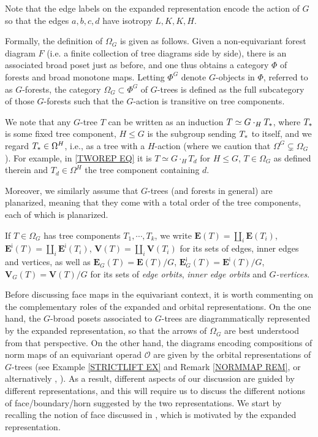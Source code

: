 \documentclass[a4paper,10pt
,draft
]{article}%
\begin{document}
Note that the edge labels on the expanded representation encode the action of $G$ so that the edges 
$a,b,c,d$ have isotropy $L,K,K,H$.

Formally, the definition of $\Omega_G$ \cite[Def. 5.44]{Per17} is given as follows.
Given a non-equivariant forest diagram $F$ 
(i.e. a finite collection of tree diagrams side by side),
there is
an associated broad poset just as before, and one thus obtains a category $\Phi$ of forests and broad monotone maps.
Letting $\Phi^G$ denote $G$-objects in $\Phi$, referred to as $G$-forests,
the category $\Omega_G \subset \Phi^G$ of $G$-trees
is defined as the full subcategory of those $G$-forests such that the $G$-action is transitive on tree components.

We note that any $G$-tree $T$ can be written as
an induction $T \simeq G \cdot_H T_{\**}$, where $T_{\**}$ is some fixed tree component, $H\leq G$ is the subgroup sending $T_{\**}$ to itself,
and we regard $T_{\**} \in \Omega^H$, i.e., as a tree with a $H$-action (where we caution that $\Omega^G \subsetneq \Omega_G$).
For example, in \eqref{TWOREP EQ} it is 
$T \simeq G \cdot_H T_d$ for $H\leq G$, $T \in \Omega_G$ as defined therein and
$T_d \in \Omega^H$ the tree component containing $d$. 

Moreover, we similarly assume that $G$-trees (and forests in general) are planarized, meaning that they come with a total order of the tree components, each of which is  planarized.

If $T\in \Omega_G$ has tree components $T_1,\cdots, T_k$, we write
$\boldsymbol{E}(T) = \amalg_i \boldsymbol{E}(T_i)$, 
$\boldsymbol{E}^{\mathsf{i}}(T) = 
\amalg_i \boldsymbol{E}^{\mathsf{i}}(T_i)$,
$\boldsymbol{V}(T) = \amalg_i \boldsymbol{V}(T_i)$
for its sets of edges, inner edges and vertices, as well as
$\boldsymbol{E}_G(T) = \boldsymbol{E}(T)/G$,
$\boldsymbol{E}^{\mathsf{i}}_G(T) = \boldsymbol{E}^{\mathsf{i}}(T)/G$,
$\boldsymbol{V}_G(T) = \boldsymbol{V}(T)/G$ for its sets of 
\textit{edge orbits},
\textit{inner edge orbits} and
\textit{$G$-vertices}.

Before discussing face maps in the equivariant context, it is worth commenting on the complementary roles of the expanded and orbital representations.
On the one hand, the $G$-broad posets associated to $G$-trees are diagrammatically represented by the expanded representation,
so that the arrows of $\Omega_{G}$ are best understood from that perspective.
On the other hand, the diagrams encoding compositions of norm maps of an equivariant operad $\mathcal{O}$
are given by the orbital representations of  
$G$-trees (see Example \ref{STRICTLIFT EX} and Remark \ref{NORMMAP REM}, or alternatively 
\cite[Ex. 4.9]{Per17}, \cite[(1.10)]{BP17}).
As a result, different aspects of our discussion are guided by different representations, and this will require us to discuss the different notions of face/boundary/horn suggested by the two representations.
We start by recalling the notion of face discussed in \cite{Per17}, which is motivated by the expanded representation.
\end{document}
